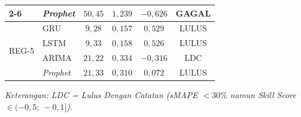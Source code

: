 \begin{table}[htbp]
\begin{tabular}{|p{2.2cm}|p{1.5cm}|c|c|c|c|}
\cline{2-6}
 & \textit{Prophet} & $50{,}45$ & $1{,}239$ & $-0{,}626$ & GAGAL \\
\hline
\multirow{4}{*}{REG-5} & GRU & $9{,}28$ & $0{,}157$ & $0{,}529$ & LULUS \\
\cline{2-6}
 & LSTM & $9{,}33$ & $0{,}158$ & $0{,}526$ & LULUS \\
\cline{2-6}
 & ARIMA & $21{,}22$ & $0{,}334$ & $-0{,}316$ & LDC \\
\cline{2-6}
 & \textit{Prophet} & $21{,}33$ & $0{,}310$ & $0{,}072$ & LULUS \\
\hline
\end{tabular}
\begin{flushleft}
\footnotesize\textit{Keterangan: LDC = Lulus Dengan Catatan (sMAPE $< 30\%$ namun \textit{Skill Score} $\in (-0{,}5;\ -0{,}1]$).}
\end{flushleft}
\end{table}
